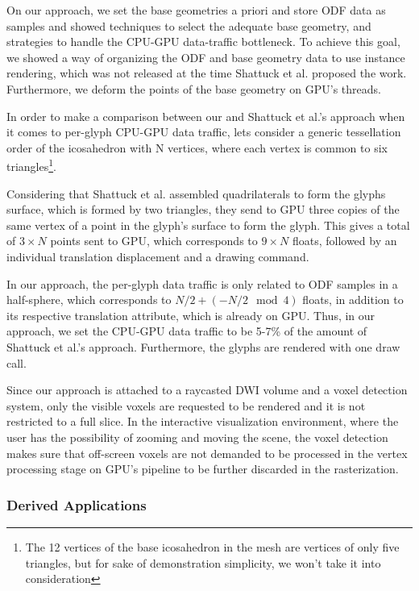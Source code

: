 \documentclass[twoside,twocolumn,10pt]{article}
\begin{document}
On our approach, we set the base geometries a priori and store ODF data as samples and showed techniques to select the adequate base geometry, and strategies to handle the CPU-GPU data-traffic bottleneck. To achieve this goal, we showed a way of organizing the ODF and base geometry data to use instance rendering, which was not released at the time Shattuck et al. proposed the work. Furthermore, we deform the points of the base geometry on GPU's threads.

In order to make a comparison between our and Shattuck et al.'s \cite{shattuck2008} approach when it comes to per-glyph CPU-GPU data traffic, lets consider a generic tessellation order of the icosahedron with N vertices, where each vertex is common to six triangles\footnote{The 12 vertices of the base icosahedron in the mesh are vertices of only five triangles, but for sake of demonstration simplicity, we won't take it into consideration}.

Considering that Shattuck et al. \cite{shattuck2008} assembled quadrilaterals to form the glyphs surface, which is formed by two triangles, they send to GPU three copies of the same vertex of a point in the glyph's surface to form the glyph. This gives a total of $3\times N$ points sent to GPU, which corresponds to $9\times N$ floats, followed by an individual translation displacement and a drawing command.

In our approach, the per-glyph data traffic is only related to ODF samples in a half-sphere, which corresponds to $N/2 + (-N/2 \mod{4})$ floats, in addition to its respective translation attribute, which is already on GPU. Thus, in our approach, we set the CPU-GPU data traffic to be 5-7\% of the amount of Shattuck et al.'s approach. Furthermore, the glyphs are rendered with one draw call.

Since our approach is attached to a raycasted DWI volume and a voxel detection system, only the visible voxels are requested to be rendered and it is not restricted to a full slice. In the interactive visualization environment, where the user has the possibility of zooming and moving the scene, the voxel detection makes sure that off-screen voxels are not demanded to be processed in the vertex processing stage on GPU's pipeline to be further discarded in the rasterization.

\subsubsection{Derived Applications}
\end{document}
